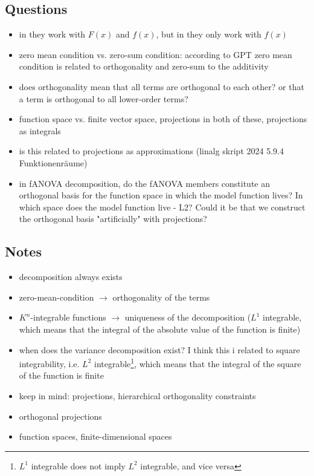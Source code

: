 \subsection*{Questions}
\begin{itemize}
    \item in \cite{hooker_discovering_2004} they work with $F(x)$ and $f(x)$, but in \cite{sobol_global_2001} they only work with $f(x)$
    \item zero mean condition vs. zero-sum condition: according to GPT zero mean condition is related to orthogonality and zero-sum to the additivity
    \item does orthogonality mean that all terms are orthogonal to each other? or that a term is orthogonal to all lower-order terms?
    \item function space vs. finite vector space, projections in both of these, projections as integrals
    \item is this related to projections as approximations (linalg skript 2024 5.9.4 Funktionenräume)
    \item in fANOVA decomposition, do the fANOVA members constitute an orthogonal basis for the function space in which the model function lives? In which space does the model function live - L2? Could it be that we construct the orthogonal basis "artificially" with projections? 
\end{itemize}


\subsection*{Notes}
\begin{itemize}
    \item decomposition always exists
    \item zero-mean-condition $\rightarrow$ orthogonality of the terms
    \item $K^n$-integrable functions $\rightarrow$ uniqueness of the decomposition ($L^1$ integrable, which means that the integral of the absolute value of the function is finite)
    \item when does the variance decomposition exist? I think this i related to square integrability, i.e. $L^2$ integrable\footnote{$L^1$ integrable does not imply $L^2$ integrable, and vice versa}, which means that the integral of the square of the function is finite
    \item keep in mind: projections, hierarchical orthogonality constraints
\end{itemize}



\begin{itemize}
    \item orthogonal projections
    \item function spaces, finite-dimensional spaces
\end{itemize}








